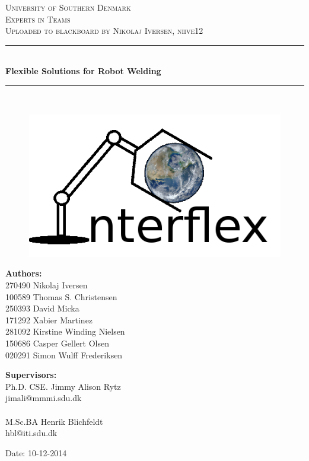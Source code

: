 \begin{titlepage}
\begin{center}

\textsc{\LARGE University of Southern Denmark}\\[1.5cm]
\textsc{\Large Experts in Teams}\\[0.5cm]
\textsc{Uploaded to blackboard by Nikolaj Iversen, niive12}\\[0.5cm]
\vfill
\hrule ~\\[0.3cm]
{ \huge \bfseries Flexible Solutions for Robot Welding \\[0.4cm] }
\hrule ~\\[1.5cm]
\begin{figure}[!h]
	\centering
	\includegraphics[scale=0.1]{./graphics/logo}
\end{figure}
\vfill

\begin{minipage}[t]{7.9cm}
\begin{flushleft} \large
\textbf{Authors:}\\
270490 Nikolaj Iversen \\
100589 Thomas S. Christensen \\
250393 David Micka \\
171292 Xabier Martinez \\
281092 Kirstine Winding Nielsen \\
150686 Casper Gellert Olsen \\
020291 Simon Wulff Frederiksen\\
\end{flushleft}
\end{minipage}
\begin{minipage}[t]{7.9cm}
\begin{flushright} \large
\textbf{Supervisors:} \\
Ph.D. CSE. Jimmy Alison Rytz \\
jimali@mmmi.sdu.dk\\~\\
M.Sc.BA Henrik Blichfeldt\\
hbl@iti.sdu.dk\\
\end{flushright}
\end{minipage}

\vspace{1.2cm}
Date: 10-12-2014

\end{center}

\end{titlepage}